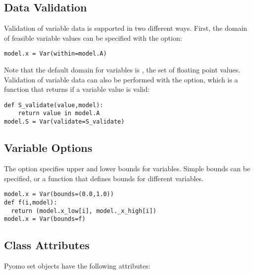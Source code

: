 \subsection{Data Validation}

Validation of variable data is supported in two different ways.  First, 
the domain of feasible variable values can be specified with the 
option:
\begin{lstlisting}
model.x = Var(within=model.A)
\end{lstlisting}
Note that the default domain for variables is , the set of floating
point values. Validation of variable data can also be performed with the  option, which is a function that returns  if a variable value is valid:
\begin{lstlisting}
def S_validate(value,model):
    return value in model.A
model.S = Var(validate=S_validate)
\end{lstlisting}


\subsection{Variable Options}

The option  specifies upper and lower bounds for variables.
Simple bounds can be specified, or a function that defines bounds for
different variables.
\begin{lstlisting}
model.x = Var(bounds=(0.0,1.0))
def f(i,model):
  return (model.x_low[i], model._x_high[i])
model.x = Var(bounds=f)
\end{lstlisting}


\subsection{Class Attributes}

Pyomo set objects have the following attributes:

